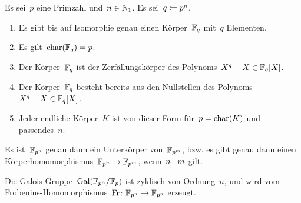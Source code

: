 \begin{theorem}
  Es sei~$p$ eine Primzahl und~$n \in \mathbb{N}_1$.
  Es sei~$q \coloneqq p^n$.
  \begin{enumerate}
    \item
      Es gibt bis auf Isomorphie genau einen Körper~$\mathbb{F}_q$ mit~$q$ Elementen.
    \item
      Es gilt~$\operatorname{char}(\mathbb{F}_q) = p$.
    \item
      Der Körper~$\mathbb{F}_q$ ist der Zerfällungskörper des Polynoms~$X^q - X \in \mathbb{F}_q[X]$.
    \item
      Der Körper~$\mathbb{F}_q$ besteht bereits aus den Nullstellen des Polynoms~$X^q - X \in \mathbb{F}_q[X]$.
    \item
      Jeder endliche Körper~$K$ ist von dieser Form für~$p = \operatorname{char}(K)$ und passendes~$n$.
  \end{enumerate}
\end{theorem}

\begin{proposition}
  Es ist~$\mathbb{F}_{p^n}$ genau dann ein Unterkörper von~$\mathbb{F}_{p^m}$, bzw. es gibt genau dann einen Körperhomomorphismus~$\Finite_{p^n} \to \Finite_{p^m}$, wenn~$n \mid m$ gilt.
\end{proposition}

\begin{proposition}
  Die Galois-Gruppe~$\operatorname{Gal}(\mathbb{F}_{p^n} / \mathbb{F}_p)$ ist zyklisch von Ordnung~$n$, und wird vom Frobenius-Homomorphismus~$\Fr \colon \Finite_{p^n} \to \Finite_{p^n}$ erzeugt.
\end{proposition}





